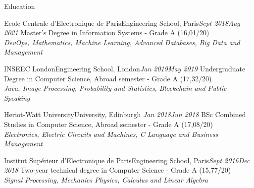 \documentclass{resume}
\begin{document}
	\begin{rSection}{Education}
		\begin{school}{Ecole Centrale d'Electronique de Paris}{Engineering School, Paris}{\em Sept 2018}{\em Aug 2021}{
			Master's Degree in Information Systems - Grade A (16,01/20)  \\ 
			\textit{\small{DevOps, Mathematics, Machine Learning, Advanced Databases, Big Data and Management}}
		}
		\end{school}

		\begin{school}{INSEEC London}{Engineering School, London}{\em Jan 2019}{\em May 2019}{
			Undergraduate Degree in Computer Science,  Abroad semester - Grade A (17,32/20)  \\
			\textit{\small{Java, Image Processing, Probability and Statistics, Blockchain and Public Speaking}}		
		}
		\end{school}
		
		\begin{school}{Heriot-Watt University}{University, Edinburgh }{\em Jan 2018}{\em Jun 2018}{
			BSc Combined Studies in Computer Science,  Abroad semester - Grade A (17,08/20) \\
			\textit{\small{Electronics, Electric Circuits and Machines, C Language and Business Management}}
		}	
		\end{school}

		\begin{school}{Institut Supérieur d'Electronique de Paris}{Engineering School, Paris}{\em Sept 2016}{\em Dec 2018}{
			Two-year technical degree in Computer Science - Grade A (15,77/20)\\
			\textit{\small{Signal Processing, Mechanics Physics, Calculus and Linear Algebra}}
		}
		\end{school}
	\end{rSection}
\end{document}
